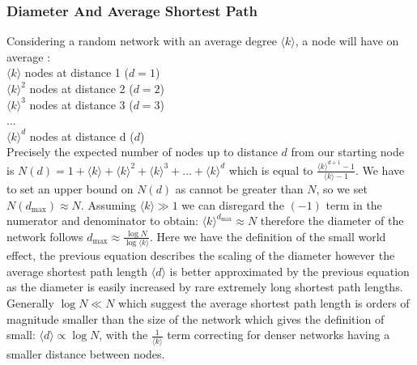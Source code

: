 \documentclass{article}
\begin{document}
            \subsubsection{Diameter And Average Shortest Path}
            Considering a random network with an average degree $\langle k \rangle$, a node will have on average \parencite{barabasi2013network}:\\
            $\langle k \rangle$ nodes at distance 1 ($d=1$)\\
            $\langle k \rangle^2$ nodes at distance 2 ($d=2$)\\
            $\langle k \rangle^3$ nodes at distance 3 ($d=3$)\\
            ...\\
            $\langle k \rangle^d$ nodes at distance d ($d$)\\
            Precisely the expected number of nodes up to distance $d$ from our starting node is $N(d) = 1+\langle k \rangle+\langle k \rangle^2+\langle k \rangle^3+...+\langle k \rangle^d$ which is equal to $\frac{\langle k \rangle^{d+1}-1}{\langle k \rangle -1}$. We have to set an upper bound on $N(d)$ as cannot be greater than $N$, so we set $N(d_{\text{max}}) \approx N$. Assuming $\langle k \rangle \gg 1$ we can disregard the $(-1)$ term in the numerator and denominator to obtain: $\langle k \rangle^{d_{\text{max}}} \approx N$ therefore the diameter of the network follows $d_{\text{max}} \approx \frac{\log{N}}{\log{\langle k \rangle}}$. Here we have the definition of the small world effect, the previous equation describes the scaling of the diameter however the average shortest path length $\langle d \rangle$ is better approximated by the previous equation as the diameter is easily increased by rare extremely long shortest path lengths. Generally $\log{N} \ll N$ which suggest the average shortest path length is orders of magnitude smaller than the size of the network which gives the definition of small: $\langle d \rangle \propto \log{N}$, with the $\frac{1}{\langle k \rangle}$ term correcting for denser networks having a smaller distance between nodes.
\end{document}
